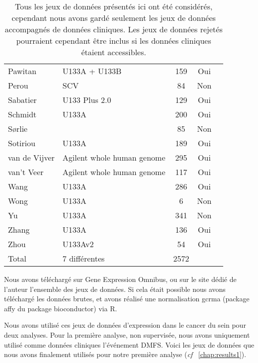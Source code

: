 \begin{table}
\begin{center}
\begin{tabular}{llccc}
						Pawitan			& U133A + U133B						& 159	& Oui	\\
						Perou			& SCV								& 84	& Non	\\
						Sabatier		& U133 Plus 2.0						& 129	& Oui	\\
						Schmidt			& U133A								& 200	& Oui	\\
						S{\o}rlie		&									& 85	& Non	\\
						Sotiriou		& U133A								& 189	& Oui	\\
						van de Vijver	& Agilent whole human genome		& 295	& Oui	\\
						van't Veer		& Agilent whole human genome		& 117	& Oui	\\
						Wang			& U133A								& 286	& Oui	\\
						Wong			& U133A								& 6		& Non	\\
						Yu				& U133A								& 341	& Non	\\
						Zhang			& U133A								& 136	& Oui	\\
						Zhou			& U133Av2							& 54	& Oui	\\
						\midrule
						Total			& 7 différentes						& 2572	&		\\
						\bottomrule
					\end{tabular}
					\label{tab:MetDatasets}
					\vspace{5ex}
					\caption*{Tous les jeux de données présentés ici ont été considérés, cependant nous avons gardé seulement les jeux de données accompagnés de données cliniques. Les jeux de données rejetés pourraient cependant être inclus si les données cliniques étaient accessibles.}
				\end{center}
			\end{table}

			Nous avons téléchargé sur Gene Expression Omnibus, ou sur le site dédié de l'auteur l'ensemble des jeux de données. Si cela était possible nous avons téléchargé les données brutes, et avons réalisé une normalisation gcrma (package affy du package bioconductor) via R.

			Nous avons utilisé ces jeux de données d'expression dans le cancer du sein pour deux analyses.
			Pour la première analyse, non supervisée, nous avons uniquement utilisé comme données cliniques l'événement DMFS.
			Voici les jeux de données que nous avons finalement utilisés pour notre première analyse (\emph{cf} ~\ref{chap:results1}).

